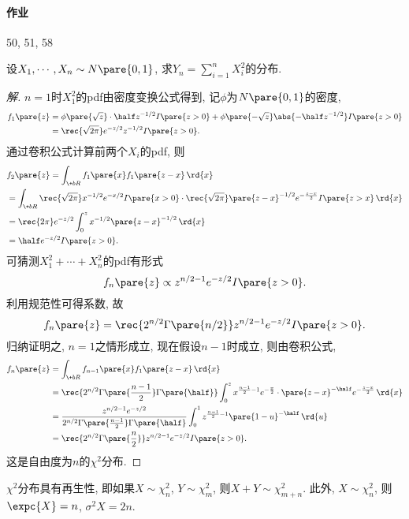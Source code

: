 \documentclass{ctexart}
\begin{document}
\paragraph{作业} %
\label{par:作业}

50, 51, 58


\begin{sample}
    \begin{ex}
        设$X_1,\cdots,X_n\sim N\pare{0,1}$, 求$\displaystyle Y_n = \sum_{i=1}^n X_i^2$的分布.
    \end{ex}
    \begin{proof}[解]
        $n=1$时$X_1^2$的pdf由密度变换公式得到, 记$\phi$为$N\pare{0,1}$的密度,
        \begin{align*}
            f_1\pare{z} &= \phi\pare{\sqrt{z}}\cdot\half z^{-1/2} I\pare{z>0} + \phi\pare{-\sqrt{z}}\abs{-\half z^{-1/2}}I\pare{z>0} \\
            &= \rec{\sqrt{2\pi}}e^{-z/2}z^{-1/2}I\pare{z>0}.
        \end{align*}
        通过卷积公式计算前两个$X_i$的pdf, 则
        \begin{align*}
            & f_{2}\pare{z} = \int_{\+bR} f_1\pare{x}f_1\pare{z-x}\,\rd{x} \\
            &= \int_{\+bR} \rec{\sqrt{2\pi}} x^{-1/2}e^{-x/2}I\pare{x>0}\cdot \rec{\sqrt{2\pi}} \pare{z-x}^{-1/2} e^{-\frac{z-x}{2}} I\pare{z>x}\,\rd{x} \\
            &= \rec{2\pi}e^{-z/2}\int_0^z x^{-1/2}\pare{z-x}^{-1/2}\,\rd{x} \\
            &= \half e^{-z/2}I\pare{z>0}.
        \end{align*}
        可猜测$X_1^2 + \cdots + X_n^2$的pdf有形式
        \[ f_n\pare{z} \propto z^{n/2-1}e^{-z/2} I\pare{z>0}. \]
        利用规范性可得系数, 故
        \[ f_n\pare{z} = \rec{2^{n/2}\Gamma\pare{n/2}}z^{n/2-1}e^{-z/2}I\pare{z>0}. \]
        归纳证明之, $n=1$之情形成立, 现在假设$n-1$时成立, 则由卷积公式,
        \begin{align*}
            f_n\pare{z} &= \int_{\+bR} f_{n-1}\pare{x}f_1\pare{z-x}\,\rd{x} \\
            &= \rec{2^{n/2}\Gamma\pare{\frac{n-1}{2}}\Gamma\pare{\half}} \int_0^z x^{\frac{n-1}{2}-1}e^{-\frac{x}{2}}\cdot \pare{z-x}^{-\half} e^{-\frac{z-x}{2}}\,\rd{x} \\
            &= \frac{z^{n/2-1}e^{-z/2}}{2^{n/2}\Gamma\pare{\frac{n-1}{2}}\Gamma\pare{\half}} \int_0^1 z^{\frac{n-1}{2} - 1}\pare{1-u}^{-\half}\,\rd{u} \\
            &= \rec{2^{n/2}\Gamma\pare{\frac{n}{2}}}z^{n/2-1}e^{-z/2}I\pare{z>0}.
        \end{align*}
        这是自由度为$n$的$\chi^2$分布.
    \end{proof}
    $\chi^2$分布具有再生性, 即如果$X\sim \chi_n^2$, $Y\sim \chi_m^2$, 则$X+Y\sim \chi_{m+n}^2$. 此外, $X\sim \chi_n^2$, 则$\expc{X}=n$, $\sigma^2 X = 2n$.
\end{sample}
\end{document}
